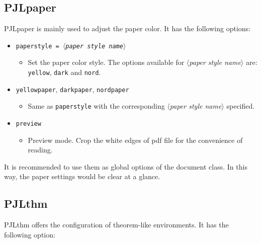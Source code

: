 \documentclass[allowbf,regionalref,puretext]{lebhart}
\providecommand{\meta}[1]{$\langle${\normalfont\itshape#1}$\rangle$}
\providecommand{\PJLpaper}{\textsf{PJLpaper}}
\providecommand{\PJLthm}{\textsf{PJLthm}}
\begin{document}
\clearpage
\subsection{PJLpaper}

\PJLpaper{} is mainly used to adjust the paper color. It has the following options:

\vspace{-.3\baselineskip}
\begin{itemize}
    \item \texttt{paperstyle = \meta{paper style name}}
        \begin{itemize}
            \item Set the paper color style. The options available for \meta{paper style name} are: \texttt{yellow}, \texttt{dark} and \texttt{nord}.
        \end{itemize}
    \item \texttt{yellowpaper}, \texttt{darkpaper}, \texttt{nordpaper}
        \begin{itemize}
            \item Same as \texttt{paperstyle} with the corresponding \meta{paper style name} specified.
        \end{itemize}
    \item \texttt{preview}
        \begin{itemize}
            \item Preview mode. Crop the white edges of pdf file for the convenience of reading.
        \end{itemize}
\end{itemize}
\vspace{-.3\baselineskip}

It is recommended to use them as global options of the document class. In this way, the paper settings would be clear at a glance.

\subsection{PJLthm}

\PJLthm{} offers the configuration of theorem-like environments. It has the following option:
\end{document}
